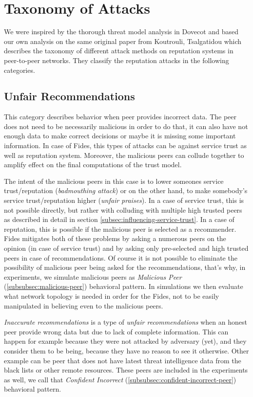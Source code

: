 \section{Taxonomy of Attacks}
\label{sec:taxonomy-of-attacks}
We were inspired by the thorough threat model analysis in Dovecot \cite{dita}  and based our own analysis on the same original paper from Koutrouli, Tsalgatidou \cite{KOUTROULI201247} which describes the taxonomy of different attack methods on reputation systems in peer-to-peer networks.
They classify the reputation attacks in the following categories.

\subsection{Unfair Recommendations}
\label{subsec:unfair-recommendations}
This category describes behavior when peer provides incorrect data.
The peer does not need to be necessarily malicious in order to do that, it can also have not enough data to make correct decisions or maybe it is missing some important information.
In case of Fides, this types of attacks can be against service trust as well as reputation system.
Moreover, the malicious peers can collude together to amplify effect on the final computations of the trust model.

The intent of the malicious peers in this case is to lower someones service trust/reputation (\textit{badmouthing attack}) or on the other hand, to make somebody's service trust/reputation higher (\textit{unfair praises}).
In a case of service trust, this is not possible directly, but rather with colluding with multiple high trusted peers as described in detail in section \ref{subsec:influencing-service-trust}.
In a case of reputation, this is possible if the malicious peer is selected as a recommender.
Fides mitigates both of these problems by asking a numerous peers on the opinion (in case of service trust) and by asking only pre-selected and high trusted peers in case of recommendations.
Of course it is not possible to eliminate the possibility of malicious peer being asked for the recommendations, that's why, in experiments, we simulate malicious peers as \textit{Malicious Peer} (\ref{subsubsec:malicious-peer}) behavioral pattern.
In simulations we then evaluate what network topology is needed in order for the Fides, not to be easily manipulated in believing even to the malicious peers.

\textit{Inaccurate recommendations} is a type of \textit{unfair recommendations} when an honest peer provide wrong data but due to lack of complete information.
This can happen for example because they were not attacked by adversary (yet), and they consider them to be being, because they have no reason to see it otherwise.
Other example can be peer that does not have latest threat intelligence data from the black lists or other remote resources.
These peers are included in the experiments as well, we call that \textit{Confident Incorrect} (\ref{subsubsec:confident-incorrect-peer}) behavioral pattern.

